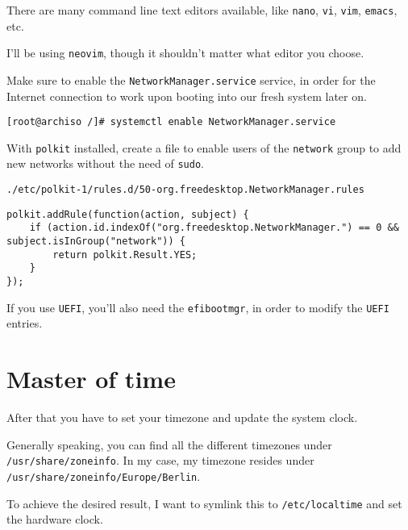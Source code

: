 \documentclass[9pt]{report}
\newenvironment{NOTE}
{\begin{tcolorbox}[colback=admonitionBG,coltitle=draculaFG,colframe=draculaBlue,colbacktitle=draculaBlue,title=NOTE]}
{\end{tcolorbox}}
\newenvironment{mintedlisting}{\captionsetup{format=plain,width=.75\textwidth,type=listing}}{}
\begin{document}
\begin{NOTE}
    There are many command line text editors available, like \texttt{nano}, \texttt{vi}, \texttt{vim}, \texttt{emacs}, etc.


    I’ll be using \texttt{neovim}, though it shouldn’t matter what editor you choose.

\end{NOTE}
Make sure to enable the \texttt{NetworkManager.service} service, in order for the Internet connection to work upon booting into our fresh system later on.


\begin{verbatim}
[root@archiso /]# systemctl enable NetworkManager.service
\end{verbatim}

With \texttt{polkit} installed, create a file to enable users of the \texttt{network} group to add new networks without the need of \texttt{sudo}.


\begin{mintedlisting}
    \caption*{\texttt{./etc/\linebreak[3]{}polkit-1/\linebreak[3]{}rules.d/\linebreak[3]{}50-org.freedesktop.NetworkManager.rules}}
    \begin{verbatim}
polkit.addRule(function(action, subject) {
    if (action.id.indexOf("org.freedesktop.NetworkManager.") == 0 && subject.isInGroup("network")) {
        return polkit.Result.YES;
    }
});
    \end{verbatim}
\end{mintedlisting}

If you use \texttt{UEFI}, you’ll also need the \texttt{efibootmgr}, in order to modify the \texttt{UEFI} entries.

\newpage

\hypertarget{x-master-of-time}{\section{Master of time}}
After that you have to set your timezone and update the system clock.


Generally speaking, you can find all the different timezones under \texttt{/usr/\allowbreak{}share/\allowbreak{}zoneinfo}.
In my case, my timezone resides under \texttt{/usr/\allowbreak{}share/\allowbreak{}zoneinfo/\allowbreak{}Europe/\allowbreak{}Berlin}.


To achieve the desired result, I want to symlink this to \texttt{/etc/localtime} and set the hardware clock.
\end{document}
